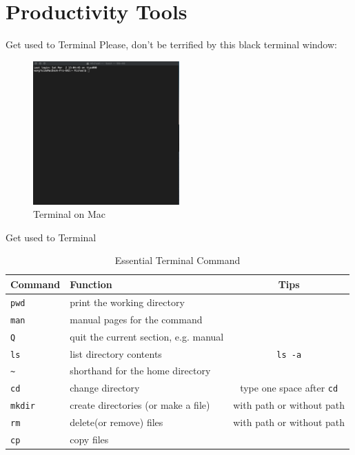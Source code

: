 \documentclass[handout]{beamer} %
\begin{document}
\section{Productivity Tools}


\begin{frame}{Get used to Terminal}
	Please, don't be terrified by this black terminal window:
	\begin{figure}[H]
		\centering
		\includegraphics[width = 0.5\textwidth]{Pictures/terminal}
		\caption{Terminal on Mac}
	\end{figure}
\end{frame}

\begin{frame}{Get used to Terminal}
\footnotesize
\begin{table}[H]
	\centering
	\begin{tabular}{llc}
	\hline
	\hline
		Command & Function & Tips \\
		\hline
		\texttt{pwd} & print the working directory & \\
		\texttt{man} & manual pages for the command & \\
		\texttt{Q} & quit the current section, e.g. manual & \\
		\texttt{ls} & list directory contents & \texttt{ls -a} \\
		\texttt{\~} & shorthand for the home directory & \\
		\texttt{cd} & change directory & type one space after \texttt{cd} \\
		\texttt{mkdir} & create directories (or make a file) & with path or without path \\
		\texttt{rm} & delete(or remove) files & with path or without path \\
		\texttt{cp} & copy files & \\
		\hline
	\end{tabular}
	\caption{Essential Terminal Command}
\end{table}

\end{frame}
\end{document}
